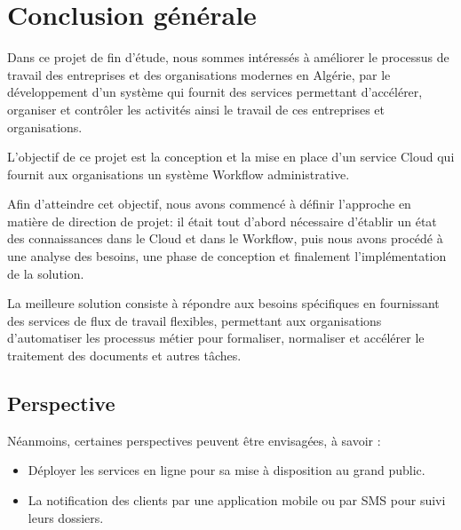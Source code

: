\chapter*{Conclusion générale }
\large
Dans ce projet de fin d’étude, nous sommes intéressés à améliorer le processus de travail des entreprises et des organisations modernes en Algérie, par le développement d'un système qui fournit des services permettant d’accélérer, organiser et contrôler les activités ainsi le travail de ces entreprises et organisations.

L'objectif de ce projet est la conception et la mise en place d'un service Cloud qui fournit aux organisations un système Workflow administrative. 

Afin d’atteindre cet objectif, nous avons commencé à définir l’approche en matière de direction de projet: il était tout d’abord nécessaire d’établir un état des connaissances dans le Cloud et dans le Workflow, puis nous avons procédé à une analyse des besoins, une phase de conception et finalement l'implémentation de la solution.
 
 
La meilleure solution consiste à répondre aux besoins spécifiques en fournissant des services de flux de travail flexibles, permettant aux organisations d'automatiser les processus métier pour formaliser, normaliser et accélérer le traitement des documents et autres tâches.

\section*{Perspective}
Néanmoins, certaines perspectives peuvent être envisagées, à savoir : 

 \begin{itemize}
        \item  Déployer les services en ligne pour sa mise à disposition au grand public.
        \item   La notification des clients par une application mobile ou par SMS pour suivi leurs dossiers.
 \end{itemize}

\normalsize